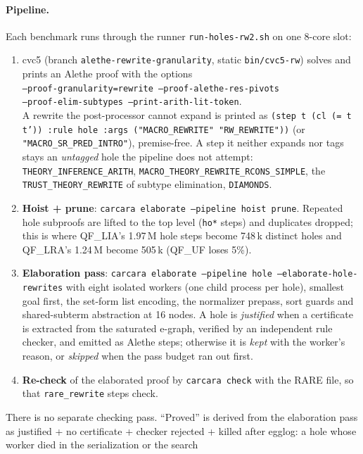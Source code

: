 \documentclass[11pt,a4paper]{article}
\newcommand{\UF}{QF\_UF}
\newcommand{\LIA}{QF\_LIA}
\newcommand{\LRA}{QF\_LRA}
\newcommand{\code}[1]{\texttt{#1}}
\begin{document}
\paragraph{Pipeline.} Each benchmark runs through the runner
\code{run-holes-rw2.sh} on one 8-core slot:
\begin{enumerate}
  \item cvc5 (branch \code{alethe-rewrite-granularity}, static
    \code{bin/cvc5-rw}) solves and prints an Alethe proof with the options\\
    \code{--proof-granularity=rewrite --proof-alethe-res-pivots}\\
    \code{--proof-elim-subtypes --print-arith-lit-token}.\\
    A rewrite the post-processor cannot expand is printed as
    \code{(step t (cl (= t t')) :rule hole :args ("MACRO\_REWRITE"
    "RW\_REWRITE"))} (or \code{"MACRO\_SR\_PRED\_INTRO"}), premise-free.
    A step it neither expands nor tags stays an \emph{untagged} hole the
    pipeline does not attempt: \code{THEORY\_INFERENCE\_ARITH},
    \code{MACRO\_THEORY\_REWRITE\_RCONS\_SIMPLE}, the
    \code{TRUST\_THEORY\_REWRITE} of subtype elimination, \code{DIAMONDS}.
  \item \textbf{Hoist + prune}: \code{carcara elaborate --pipeline hoist
    prune}. Repeated hole subproofs are lifted to the top level
    (\code{ho*} steps) and duplicates dropped; this is where \LIA{}'s
    1.97\,M hole steps become 748\,k distinct holes and \LRA{}'s 1.24\,M
    become 505\,k (\UF{} loses 5\%).
  \item \textbf{Elaboration pass}: \code{carcara elaborate --pipeline hole
    --elaborate-hole-rewrites} with eight isolated workers (one child
    process per hole), smallest goal first, the set-form list encoding,
    the normalizer prepass, sort guards and shared-subterm abstraction at
    16 nodes. A hole is \emph{justified} when a certificate is extracted
    from the saturated e-graph, verified by an independent rule checker,
    and emitted as Alethe steps; otherwise it is \emph{kept} with the
    worker's reason, or \emph{skipped} when the pass budget ran out first.
  \item \textbf{Re-check} of the elaborated proof by \code{carcara check}
    with the RARE file, so that \code{rare\_rewrite} steps check.
\end{enumerate}
There is no separate checking pass. ``Proved'' is derived from the
elaboration pass as justified + no certificate + checker rejected + killed
after egglog: a hole whose worker died in the serialization or the search
\end{document}
